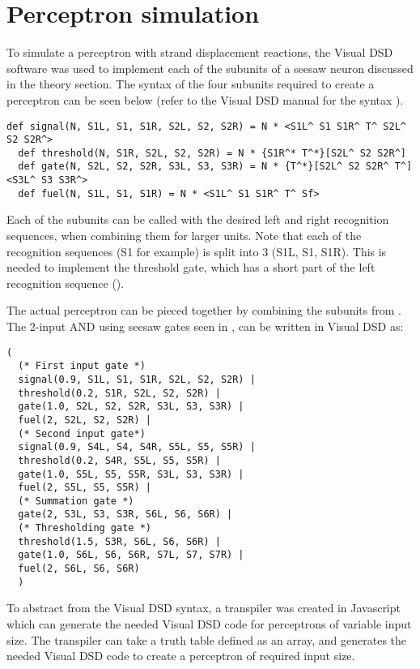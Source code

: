 \section{Perceptron simulation}

To simulate a perceptron with strand displacement reactions, the Visual DSD software was used to implement each of the subunits of a seesaw neuron discussed in the theory section. The syntax of the four subunits required to create a perceptron can be seen below (refer to the Visual DSD manual for the syntax \cite{dsdmanual}).

\begin{lstlisting}[label=dsd_subunits]
  def signal(N, S1L, S1, S1R, S2L, S2, S2R) = N * <S1L^ S1 S1R^ T^ S2L^ S2 S2R^>
  def threshold(N, S1R, S2L, S2, S2R) = N * {S1R^* T^*}[S2L^ S2 S2R^]
  def gate(N, S2L, S2, S2R, S3L, S3, S3R) = N * {T^*}[S2L^ S2 S2R^ T^]<S3L^ S3 S3R^>
  def fuel(N, S1L, S1, S1R) = N * <S1L^ S1 S1R^ T^ Sf>
\end{lstlisting}

Each of the subunits can be called with the desired left and right recognition sequences, when combining them for larger units. Note that each of the recognition sequences (S1 for example) is split into 3 (S1L, S1, S1R). This is needed to implement the threshold gate, which has a short part of the left recognition sequence ().


The actual perceptron can be pieced together by combining the subunits from . The 2-input AND using seesaw gates seen in , can be written in Visual DSD as:

\begin{lstlisting}[label=dsd_and_gate]
  (
  (* First input gate *)
  signal(0.9, S1L, S1, S1R, S2L, S2, S2R) |
  threshold(0.2, S1R, S2L, S2, S2R) |
  gate(1.0, S2L, S2, S2R, S3L, S3, S3R) |
  fuel(2, S2L, S2, S2R) |
  (* Second input gate*)
  signal(0.9, S4L, S4, S4R, S5L, S5, S5R) |
  threshold(0.2, S4R, S5L, S5, S5R) |
  gate(1.0, S5L, S5, S5R, S3L, S3, S3R) |
  fuel(2, S5L, S5, S5R) |
  (* Summation gate *)
  gate(2, S3L, S3, S3R, S6L, S6, S6R) |
  (* Thresholding gate *)
  threshold(1.5, S3R, S6L, S6, S6R) |
  gate(1.0, S6L, S6, S6R, S7L, S7, S7R) |
  fuel(2, S6L, S6, S6R)
  )
\end{lstlisting}

To abstract from the Visual DSD syntax, a transpiler was created in Javascript which can generate the needed Visual DSD code for perceptrons of variable input size. The transpiler can take a truth table defined as an array, and generates the needed Visual DSD code to create a perceptron of required input size.

